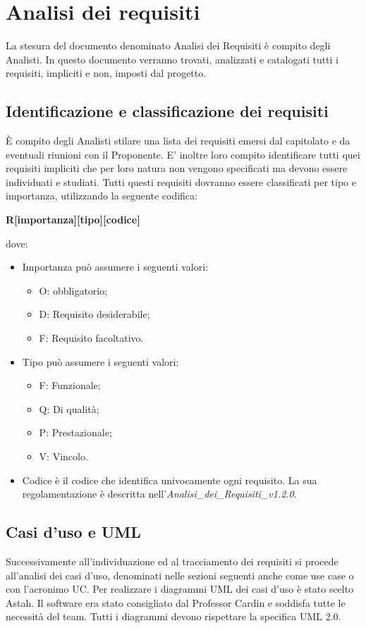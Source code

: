 \newpage
\section{Analisi dei requisiti}
\label{7.0}
La stesura del documento denominato Analisi dei Requisiti è compito degli Analisti.
In questo documento verranno trovati, analizzati e catalogati tutti i requisiti, impliciti e non, imposti dal progetto.

\subsection{Identificazione e classificazione dei requisiti}
\label{7.1}
È compito degli Analisti stilare una lista dei requisiti emersi dal capitolato e da eventuali riunioni con il Proponente. E' inoltre loro compito identificare tutti quei requisiti impliciti che per loro natura non vengono specificati ma devono essere individuati e studiati. Tutti questi requisiti dovranno essere classificati per tipo e importanza, utilizzando la seguente codifica:
\begin{center}
\textbf{R[importanza][tipo][codice]}
\end{center}
dove:
\begin{itemize}
\item Importanza può assumere i seguenti valori:
\begin{itemize}
\item O:  obbligatorio;
\item D: Requisito desiderabile;
\item F: Requisito facoltativo.
\end{itemize}
\item Tipo può assumere i seguenti valori:
\begin{itemize}
\item F: Funzionale;
\item Q: Di qualità;
\item P: Prestazionale;
\item V: Vincolo.
\end{itemize}
\item Codice è il codice che identifica univocamente ogni requisito. La sua regolamentazione è descritta nell'\emph{Analisi\_dei\_Requisiti\_v1.2.0}.
\end{itemize}

\subsection{Casi d’uso e UML}
\label{7.2}
Successivamente all'individuazione ed al tracciamento dei requisiti si procede all'analisi dei casi d'uso, denominati nelle sezioni seguenti anche come use case o con l'acronimo UC.
Per realizzare i diagrammi UML dei casi d'uso è stato scelto Astah. Il software era stato consigliato dal Professor Cardin e soddisfa tutte le necessità del team.
Tutti i diagrammi devono rispettare la specifica UML 2.0.

